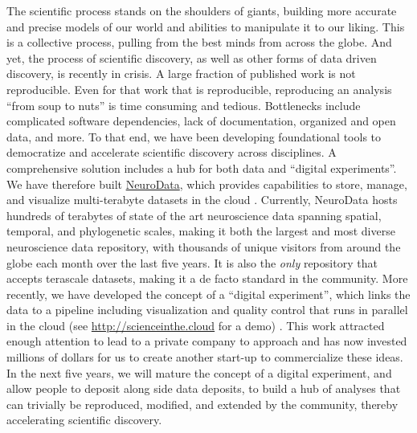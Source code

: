 \documentclass[11pt]{article}
\renewcommand{\para}[1]{\vspace{-10pt}\fontsize{10pt}{0pt}\paragraph{#1}}
\begin{document}
\vspace{15pt}
\begin{mdframed}  \end{mdframed}

The scientific process stands on the shoulders of giants, building more accurate and precise models of our world and abilities to manipulate it to our liking.  This is a collective process, pulling from the best minds from across the globe.  And yet, the process of scientific discovery, as well as other forms of data driven discovery, is recently in crisis. A large fraction of published work is not reproducible. Even for that work that is reproducible, reproducing an analysis ``from soup to nuts'' is time consuming and tedious.  Bottlenecks include complicated software dependencies, lack of documentation, organized and open data, and more.  To that end, we have been developing foundational tools to democratize and accelerate scientific discovery across disciplines.  A comprehensive solution includes a hub for both data and ``digital experiments''. We have therefore built \href{http://neurodata.io}{NeuroData}, which provides capabilities to store, manage, and visualize multi-terabyte datasets in the cloud \cite{Burns13a,Harris2015,Weiler2014}.  Currently, NeuroData hosts hundreds of terabytes of state of the art neuroscience data spanning spatial, temporal, and phylogenetic scales, making it both the largest and most diverse neuroscience data repository, with thousands of unique visitors from around the globe each month over the last five years. It is also the \emph{only} repository that accepts terascale datasets, making it a de facto standard in the community. More recently, we have developed the concept of a ``digital experiment'', which links the data to a pipeline including visualization and quality control that runs in parallel in the cloud (see  \url{http://scienceinthe.cloud} for a demo)  \cite{kiar2016science}. This work attracted enough attention to  lead to a private company to approach and has now invested millions of dollars for us to create another start-up to commercialize these ideas.  In the next five years,  we will mature the concept of a digital experiment, and allow people to deposit along side data deposits, to build a hub of analyses that can trivially be reproduced, modified, and extended by the community, thereby accelerating scientific discovery.
\end{document}
